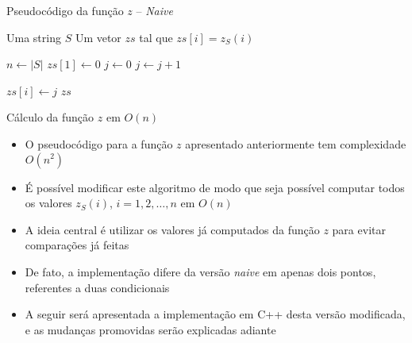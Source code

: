 \begin{frame}[fragile]{Pseudocódigo da função $z$ -- {\it Naive}}

    \begin{algorithm}[H]
        \caption{Função $z$}
        \begin{algorithmic}[1]
            \Require Uma string $S$
            \Ensure Um vetor $zs$ tal que $zs[i] = z_S(i)$

                \State $n \gets |S|$
                \State $zs[1] \gets 0$
                \State 
                    \State $j \gets 0$
                        \State $j \gets j + 1$
                    \EndWhile

                    \State $zs[i] \gets j$
                \EndFor
                \State 
                \State \Return $zs$
            \EndFunction
        \end{algorithmic}
    \end{algorithm}

\end{frame}

\begin{frame}[fragile]{Cálculo da função $z$ em $O(n)$}

    \begin{itemize}
        \item O pseudocódigo para a função $z$ apresentado anteriormente tem complexidade
            $O(n^2)$

        \item É possível modificar este algoritmo de modo que seja possível computar todos os
            valores $z_S(i)$, $i = 1, 2, \ldots, n$ em $O(n)$

        \item A ideia central é utilizar os valores já computados da função $z$ para evitar 
            comparações já feitas

        \item De fato, a implementação difere da versão \textit{naive} em apenas dois pontos,
            referentes a duas condicionais

        \item A seguir será apresentada a implementação em C++ desta versão modificada, e
            as mudanças promovidas serão explicadas adiante
    \end{itemize}

\end{frame}


